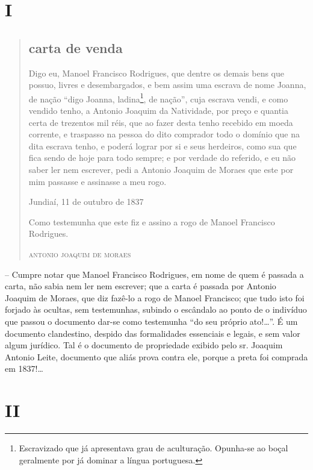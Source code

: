 {\section{I}

\begin{quote}
\subsection{carta de venda}

Digo eu, Manoel Francisco Rodrigues, que dentre os demais bens que
possuo, livres e desembargados, e bem assim uma escrava de nome Joanna,
de nação ``digo Joanna, ladina\footnote{ Escravizado que já apresentava
  grau de aculturação. Opunha-se ao boçal geralmente por já dominar a
  língua portuguesa.}, de nação'', cuja escrava vendi, e como vendido
tenho, a Antonio Joaquim da Natividade, por preço e quantia certa de
trezentos mil réis, que ao fazer desta tenho recebido em moeda corrente,
e traspasso na pessoa do dito comprador todo o domínio que na dita
escrava tenho, e poderá lograr por si e seus herdeiros, como sua que
fica sendo de hoje para todo sempre; e por verdade do referido, e eu não
saber ler nem escrever, pedi a Antonio Joaquim de Moraes que este por
mim passasse e assinasse a meu rogo.

\begin{flushright}
Jundiaí, 11 de outubro de 1837

Como testemunha que este fiz e assino a rogo de Manoel Francisco Rodrigues.

\textsc{antonio joaquim de moraes}
\end{flushright}
\end{quote}

-- Cumpre notar que Manoel Francisco Rodrigues, em nome de quem é
passada a carta, não sabia nem ler nem escrever; que a carta é passada
por Antonio Joaquim de Moraes, que diz fazê-lo a rogo de Manoel
Francisco; que tudo isto foi forjado às ocultas, sem testemunhas,
subindo o escândalo ao ponto de o indivíduo que passou o documento
dar-se como testemunha ``do seu próprio ato!\ldots{}''. É um documento
clandestino, despido das formalidades essenciais e legais, e sem valor
algum jurídico. Tal é o documento de propriedade exibido pelo sr.
Joaquim Antonio Leite, documento que aliás prova contra ele, porque a
preta foi comprada em 1837!\ldots{}

\section{II}

}

